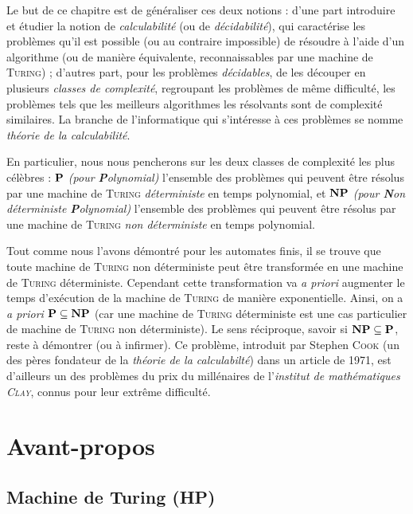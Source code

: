 \documentclass[a4paper,french,bookmarks]{book}
\newcommand{\cP}{\bbP}
\newcommand{\cNP}{\bbN\bbP}
\newcommand{\chaptertoc}[0]{
    \begin{tcolorbox}[
        enhanced,
        frame hidden,
        sharp corners,
        detach title,
        spread outwards     = 5pt,
        halign              = center,
        valign              = center,
        borderline west     = {3pt}{0pt}{main20!50!main2!95!gray!90},
        coltitle            = main20!50!main2!95!gray!90, 
        interior style      = {
            left color      = main1white2!65!gray!11,
            middle color    = main1white2!50!gray!10,
            right color     = main1white2!35!gray!9
        },
        arc                 = 0 cm,
        title               = SOMMAIRE,
        boxrule             = 0pt,
        fonttitle           = \bfseries\sffamily,
        overlay             = {
            \node[rotate=90, minimum width=1cm, anchor=south,yshift=-0.8cm]
            at (frame.west) {\tcbtitle};
        }
    ]
        \begin{minipage}{0.83\linewidth}
            \sffamily
            \minitoc
        \end{minipage}
    \end{tcolorbox}
}
\begin{document}
    Le but de ce chapitre est de généraliser ces deux notions : d'une part introduire et étudier la notion de \emph{calculabilité} (ou de \emph{décidabilité}), qui caractérise les problèmes qu'il est possible (ou au contraire impossible) de résoudre à l'aide d'un algorithme (ou de manière équivalente, reconnaissables par une machine de \textsc{Turing}) ; d'autres part, pour les problèmes \emph{décidables}, de les découper en plusieurs \emph{classes de complexité}, regroupant les problèmes de même difficulté, \ie les problèmes tels que les meilleurs algorithmes les résolvants sont de complexité similaires. La branche de l'informatique qui s'intéresse à ces problèmes se nomme \emph{théorie de la calculabilité}.\medskip
    
    En particulier, nous nous pencherons sur les deux classes de complexité les plus célèbres : $\cP$ \emph{(pour \textsf{\textbf{P}olynomial})} l'ensemble des problèmes qui peuvent être résolus par une machine de \textsc{Turing} \emph{déterministe} en temps polynomial, et $\cNP$ \emph{(pour \textsf{\textbf{N}on déterministe \textbf{P}olynomial)}} l'ensemble des problèmes qui peuvent être résolus par une machine de \textsc{Turing} \emph{non déterministe} en temps polynomial.\medskip 

    Tout comme nous l'avons démontré pour les automates finis, il se trouve que toute machine de \textsc{Turing} non déterministe peut être transformée en une machine de \textsc{Turing} déterministe. Cependant cette transformation va \emph{\EBGaramond{}a priori} augmenter le temps d'exécution de la machine de \textsc{Turing} de manière exponentielle. Ainsi, on a \emph{\EBGaramond{}a priori} $\cP \subseteq \cNP$ (car une machine de \textsc{Turing} déterministe est une cas particulier de machine de \textsc{Turing} non déterministe). Le sens réciproque, \ie savoir si $\cNP \subseteq \cP$, reste à démontrer (ou à infirmer). Ce problème, introduit par Stephen \textsc{Cook} (un des pères fondateur de la \emph{théorie de la calculabilté}) dans un article de 1971, est d'ailleurs un des problèmes du prix du millénaires de l'\emph{institut de mathématiques \textsc{Clay}}, connus pour leur extrême difficulté.\bigskip
    
    \chaptertoc
    
    \section{Avant-propos}
    
    \subsection{Machine de Turing (HP)}
    
\end{document}
